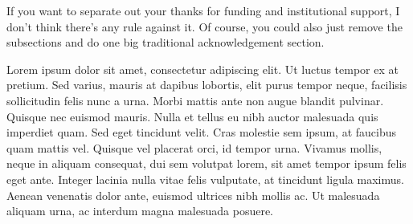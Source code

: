 If you want to separate out your thanks for funding and institutional support, I don't think there's any rule against it.  Of course, you could also just remove the subsections and do one big traditional acknowledgement section.

Lorem ipsum dolor sit amet, consectetur adipiscing elit. Ut luctus tempor ex at pretium. Sed varius, mauris at dapibus lobortis, elit purus tempor neque, facilisis sollicitudin felis nunc a urna. Morbi mattis ante non augue blandit pulvinar. Quisque nec euismod mauris. Nulla et tellus eu nibh auctor malesuada quis imperdiet quam. Sed eget tincidunt velit. Cras molestie sem ipsum, at faucibus quam mattis vel. Quisque vel placerat orci, id tempor urna. Vivamus mollis, neque in aliquam consequat, dui sem volutpat lorem, sit amet tempor ipsum felis eget ante. Integer lacinia nulla vitae felis vulputate, at tincidunt ligula maximus. Aenean venenatis dolor ante, euismod ultrices nibh mollis ac. Ut malesuada aliquam urna, ac interdum magna malesuada posuere.